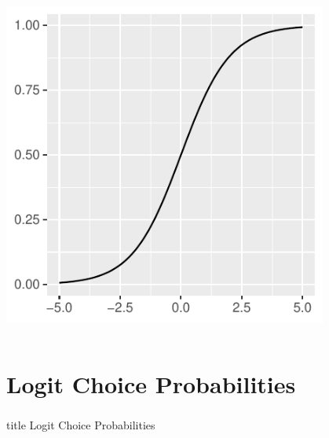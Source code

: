 \documentclass{beamer}\usepackage[]{graphicx}\usepackage[]{xcolor}
\begin{document}
\begin{frame}
\begin{columns}
\begin{column}{0.5\textwidth}
\begin{center}
				\includegraphics[width=0.8\textwidth]{logistic_cdf.pdf}          
     		\end{center}
		\end{column}
	\end{columns}
\end{frame}

\section{Logit Choice Probabilities}
\label{probs}
\begin{frame}\frametitle{}
    \vfill
    \centering
    \begin{beamercolorbox}[center]{title}
        \Large Logit Choice Probabilities
    \end{beamercolorbox}
    \vfill
\end{frame}
\end{document}

